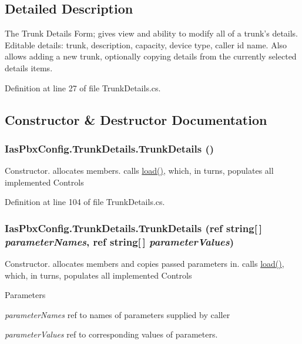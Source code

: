 \subsection{Detailed Description}
The Trunk Details Form; gives view and ability to modify all of a trunk's details. Editable details: trunk, description, capacity, device type, caller id name. Also allows adding a new trunk, optionally copying details from the currently selected details items. 

Definition at line 27 of file TrunkDetails.cs.

\subsection{Constructor \& Destructor Documentation}
\hypertarget{class_ias_pbx_config_1_1_trunk_details_a4b5a6988b18e4369e011304054412810}{
\subsubsection[{TrunkDetails}]{\setlength{\rightskip}{0pt plus 5cm}IasPbxConfig.TrunkDetails.TrunkDetails ()}}
\label{class_ias_pbx_config_1_1_trunk_details_a4b5a6988b18e4369e011304054412810}


Constructor. allocates members. calls \hyperlink{class_ias_pbx_config_1_1_trunk_details_a2dd1283dc843a19b6d5cc13e957c322b}{load()}, which, in turns, populates all implemented Controls 

Definition at line 104 of file TrunkDetails.cs.\hypertarget{class_ias_pbx_config_1_1_trunk_details_a06f0aec8ae91761316148980e1f8de53}{
\subsubsection[{TrunkDetails}]{\setlength{\rightskip}{0pt plus 5cm}IasPbxConfig.TrunkDetails.TrunkDetails (ref string\mbox{[}$\,$\mbox{]} {\em parameterNames}, \/  ref string\mbox{[}$\,$\mbox{]} {\em parameterValues})}}
\label{class_ias_pbx_config_1_1_trunk_details_a06f0aec8ae91761316148980e1f8de53}


Constructor. allocates members and copies passed parameters in. calls \hyperlink{class_ias_pbx_config_1_1_trunk_details_a2dd1283dc843a19b6d5cc13e957c322b}{load()}, which, in turns, populates all implemented Controls 
\begin{DoxyParams}{Parameters}
\item[{\em parameterNames}]ref to names of parameters supplied by caller \item[{\em parameterValues}]ref to corresponding values of parameters. \end{DoxyParams}


